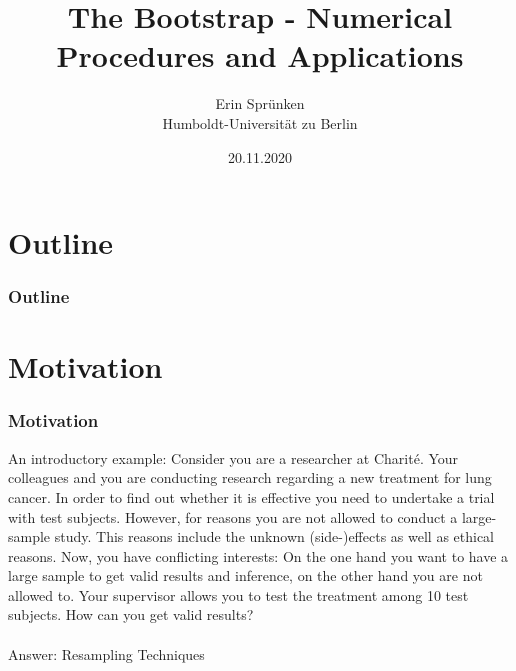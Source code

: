 \documentclass[9pt, dvipsnames]{beamer} %
\title{The Bootstrap - Numerical Procedures and Applications} %
\author[Erin Sprünken]{Erin Sprünken\\
Humboldt-Universität zu Berlin}
\date[11/2020]{20.11.2020}
\begin{document}
    \everymath{\displaystyle}

    { 
    \begin{frame}[noframenumbering]
        \titlepage 
    \end{frame}}
    \section*{Outline}
    \begin{frame}
        \frametitle{\textbf{Outline}}
        \tableofcontents
    \end{frame}
    \section{Motivation}
    \begin{frame}
    	\frametitle{\textbf{Motivation}}
    	An introductory example: Consider you are a researcher at Charité. Your colleagues and you are conducting research regarding a new treatment for lung cancer. In order to find out whether it is effective you need to undertake a trial with test subjects. However, for reasons you are not allowed to conduct a large-sample study. This reasons include the unknown (side-)effects as well as ethical reasons. Now, you have conflicting interests: On the one hand you want to have a large sample to get valid results and inference, on the other hand you are not allowed to. Your supervisor allows you to test the treatment among 10 test subjects. How can you get valid results?\\
 \hfill \\
    	Answer: Resampling Techniques
    \end{frame}
\end{document}
